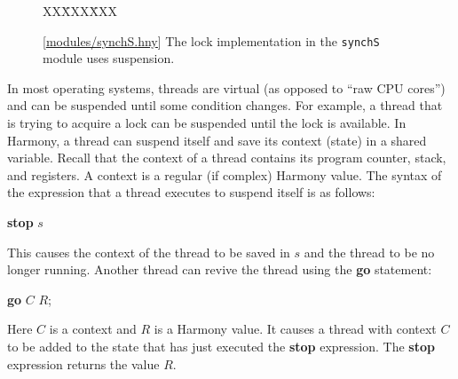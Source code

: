 \documentclass{report}
\newcommand{\harmonysource}[1]{
\begin{tabbing}
XX\=XXX\=XXX\kill
    
\end{tabbing}
}
\newcommand{\harmonylink}[1]{%
[\href{https://harmony.cs.cornell.edu/#1}{\underline{#1}}]%
}
\newenvironment{code}{
\tcolorbox
}{
\endtcolorbox
}
\begin{document}
\begin{figure}
\begin{code}
\harmonysource{locksusp}
\end{code}
\caption{\harmonylink{modules/synchS.hny} The lock implementation in the \texttt{synchS} module uses suspension.}
\label{fig:suspension}
\end{figure}

In most operating systems, threads are virtual (as opposed to ``raw CPU cores'')
and can be suspended until some condition changes.
For example, a thread that is trying to acquire a lock can be suspended until the lock is
available.
In Harmony, a thread can suspend itself and save its context (state) in a
shared variable.  Recall that the context of a thread contains
its program counter, stack, and registers.
A context is a regular (if complex) Harmony value.
The syntax of the expression that a thread executes to suspend itself
is as follows:

\begin{code}
\textbf{stop} $s$
\end{code}

This causes the context of the thread to be saved in $s$ and
the thread to be no longer running.
Another thread can revive the thread using the \textbf{go}
%
statement:

\begin{code}
\textbf{go} $C$ $R$;
\end{code}

Here $C$ is a context and $R$ is a Harmony value.
It causes a thread with context $C$ to be added to the state that has
just executed the \textbf{stop}
%
expression.  The \textbf{stop} expression returns the value $R$.
\end{document}
